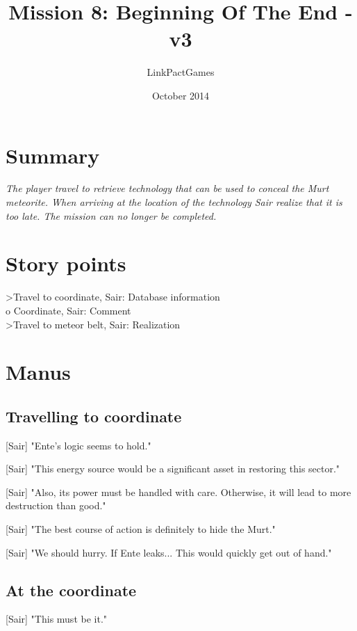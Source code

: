 \documentclass[a4paper,12pt]{article}
\begin{document}
\title{Mission 8: Beginning Of The End - v3}
\author{LinkPactGames}
\date{October 2014}
\maketitle

\section{Summary}

\textit{The player travel to retrieve technology that can be used to conceal the Murt meteorite.
When arriving at the location of the technology Sair realize that it is too late. The mission can no
longer be completed.}

\section{Story points}

\textgreater Travel to coordinate, Sair: Database information\\
o Coordinate, Sair: Comment\\
\textgreater Travel to meteor belt, Sair: Realization

\section{Manus}

\subsection{Travelling to coordinate}

[Sair] "Ente's logic seems to hold." 

[Sair] "This energy source would be a significant asset in restoring this sector."

[Sair] "Also, its power must be handled with care. Otherwise, it will lead to more destruction than good."

[Sair] "The best course of action is definitely to hide the Murt."

[Sair] "We should hurry. If Ente leaks... This would quickly get out of hand."

\subsection{At the coordinate}

[Sair] "This must be it."
\end{document}
